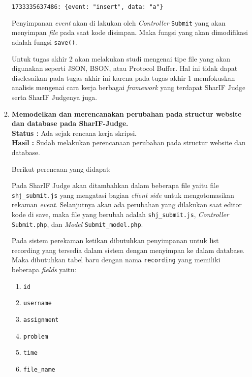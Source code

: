 \documentclass[a4paper,twoside]{article}
\begin{document}
\begin{enumerate}
	      \begin{center}
		      \verb|1733335637486: {event: "insert", data: "a"}|
	      \end{center}

	      Penyimpanan \textit{event} akan di lakukan oleh \textit{Controller} \verb|Submit| yang akan menyimpan \textit{file} pada saat kode disimpan. Maka fungsi yang akan dimodifikasi adalah fungsi \verb|save()|.

	      Untuk tugas akhir 2 akan melakukan studi mengenai tipe file yang akan digunakan seperti JSON, BSON, atau Protocol Buffer. Hal ini tidak dapat diselesaikan pada tugas akhir ini karena pada tugas akhir 1 memfokuskan analisis mengenai cara kerja berbagai \textit{framework} yang terdapat SharIF Judge serta SharIF Judgenya juga.

	\item \textbf{Memodelkan dan merencanakan perubahan pada structur website dan database pada SharIF-Judge.} \\
	      {\bf Status :} Ada sejak rencana kerja skripsi.\\
	      {\bf Hasil :} Sudah melakukan perencanaan perubahan pada structur website dan database.

	      Berikut perencaan yang didapat:

	      Pada SharIF Judge akan ditambahkan dalam beberapa file yaitu file \verb|shj_submit.js| yang mengatasi bagian \textit{client side} untuk mengotomasikan rekaman \textit{event}. Selanjutnya akan ada perubahan yang dilakukan saat editor kode di save, maka file yang berubah adalah \verb|shj_submit.js|, \textit{Controller} \verb|Submit.php|, dan \textit{Model} \verb|Submit_model.php|.

	      Pada sistem perekaman ketikan dibutuhkan penyimpanan untuk list recording yang tersedia dalam sistem dengan menyimpan ke dalam database. Maka dibutuhkan tabel baru dengan nama \verb|recording| yang memiliki beberapa \textit{fields} yaitu:

	      \begin{enumerate}
		      \item \verb|id|
		      \item \verb|username|
		      \item \verb|assignment|
		      \item \verb|problem|
		      \item \verb|time|
		      \item \verb|file_name|
	      \end{enumerate}


\end{enumerate}
\end{document}
